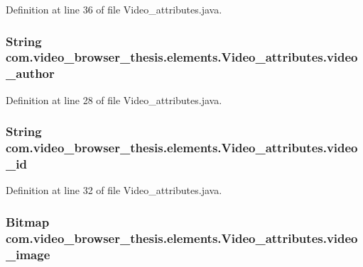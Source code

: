 Definition at line 36 of file Video\-\_\-attributes.\-java.

\hypertarget{classcom_1_1video__browser__thesis_1_1elements_1_1_video__attributes_abd33d1952b8a62347f0f661c3c2ec5ed}{
\subsubsection[{video\-\_\-author}]{\setlength{\rightskip}{0pt plus 5cm}String com.\-video\-\_\-browser\-\_\-thesis.\-elements.\-Video\-\_\-attributes.\-video\-\_\-author}}\label{classcom_1_1video__browser__thesis_1_1elements_1_1_video__attributes_abd33d1952b8a62347f0f661c3c2ec5ed}


Definition at line 28 of file Video\-\_\-attributes.\-java.

\hypertarget{classcom_1_1video__browser__thesis_1_1elements_1_1_video__attributes_a7113a6d7df8608b786990974dc8bd269}{
\subsubsection[{video\-\_\-id}]{\setlength{\rightskip}{0pt plus 5cm}String com.\-video\-\_\-browser\-\_\-thesis.\-elements.\-Video\-\_\-attributes.\-video\-\_\-id}}\label{classcom_1_1video__browser__thesis_1_1elements_1_1_video__attributes_a7113a6d7df8608b786990974dc8bd269}


Definition at line 32 of file Video\-\_\-attributes.\-java.

\hypertarget{classcom_1_1video__browser__thesis_1_1elements_1_1_video__attributes_a9a6848418e1b8750117df0f895e90320}{
\subsubsection[{video\-\_\-image}]{\setlength{\rightskip}{0pt plus 5cm}Bitmap com.\-video\-\_\-browser\-\_\-thesis.\-elements.\-Video\-\_\-attributes.\-video\-\_\-image}}\label{classcom_1_1video__browser__thesis_1_1elements_1_1_video__attributes_a9a6848418e1b8750117df0f895e90320}


